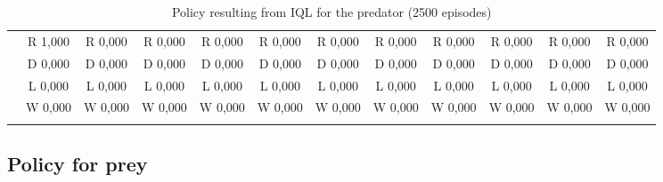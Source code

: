 \begin{table}[htbp]
\begin{tiny}
\begin{tabular}{c|c|c|c|c|c|c|c|c|c|c|c|}
&R 1,000&R 0,000&R 0,000&R 0,000&R 0,000&R 0,000&R 0,000&R 0,000&R 0,000&R 0,000&R 0,000\\
&D 0,000&D 0,000&D 0,000&D 0,000&D 0,000&D 0,000&D 0,000&D 0,000&D 0,000&D 0,000&D 0,000\\
&L 0,000&L 0,000&L 0,000&L 0,000&L 0,000&L 0,000&L 0,000&L 0,000&L 0,000&L 0,000&L 0,000\\
&W 0,000&W 0,000&W 0,000&W 0,000&W 0,000&W 0,000&W 0,000&W 0,000&W 0,000&W 0,000&W 0,000\\
\hline \\
\end{tabular}
\end{tiny}
\caption{Policy resulting from IQL for the predator (2500 episodes)}
\end{table}

\clearpage
\subsection{Policy for prey}
